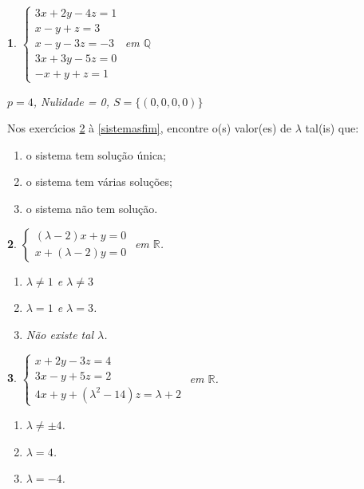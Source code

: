 \documentclass[12pt]{exam}
\newtheorem{exercicio}{}
\newcommand{\rac}{\mathbb{Q}}
\newcommand{\real}{\mathbb{R}}
\begin{document}
\begin{exercicio}\label{sistemalinearfim}
  $\begin{cases}
    3x + 2y - 4z = 1\\
    x - y + z = 3\\
    x - y - 3z = -3\\
    3x + 3y - 5z =0\\
    -x + y + z = 1
  \end{cases}$ em $\rac$
\begin{solucao}
  $p = 4$, Nulidade = 0, $S = \{(0, 0, 0, 0)\}$
\end{solucao}
\end{exercicio}

Nos exerc{\'\i}cios \ref{sistemasinicio} \`a \ref{sistemasfim}, encontre o(s) valor(es) de $\lambda$ tal(is) que:
\begin{enumerate}[label={\alph*})]
  \item o sistema tem solu\c{c}\~ao \'unica;
  \item o sistema tem v\'arias solu\c{c}\~oes;
  \item o sistema n\~ao tem solu\c{c}\~ao.
\end{enumerate}

\begin{exercicio}\label{sistemasinicio}
$\begin{cases}
  (\lambda - 2)x + y = 0\\
  x + (\lambda - 2)y = 0
\end{cases}$ em $\real$.
\begin{solucao}
  \begin{enumerate}[label={\alph*})]
    \item $\lambda \ne 1$ e $\lambda \ne 3$
    \item $\lambda = 1$ e $\lambda = 3$.
    \item N\~ao existe tal $\lambda$.
  \end{enumerate}
\end{solucao}
\end{exercicio}

\begin{exercicio}
$\begin{cases}
  x + 2y - 3z = 4\\
  3x - y + 5z = 2\\
  4x + y + (\lambda^2 - 14)z = \lambda + 2
\end{cases}$ em $\real$.
\begin{solucao}
  \begin{enumerate}[label={\alph*})]
    \item $\lambda \ne \pm 4$.
    \item $\lambda = 4$.
    \item $\lambda = -4$.
  \end{enumerate}
\end{solucao}
\end{exercicio}
\end{document}
